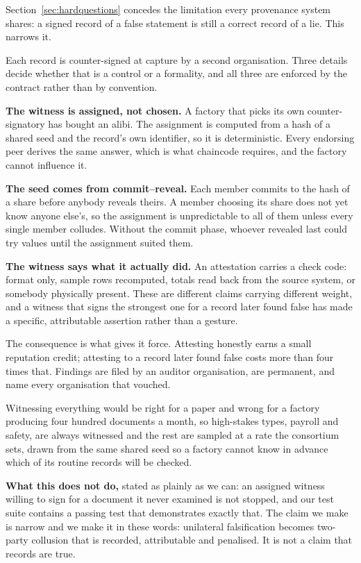 \documentclass[11pt,a4paper]{article}
\begin{document}
Section~\ref{sec:hardquestions} concedes the limitation every provenance system
shares: a signed record of a false statement is still a correct record of a lie.
This narrows it.

Each record is counter-signed at capture by a second organisation. Three details
decide whether that is a control or a formality, and all three are enforced by
the contract rather than by convention.

\textbf{The witness is assigned, not chosen.} A factory that picks its own
counter-signatory has bought an alibi. The assignment is computed from a hash of
a shared seed and the record's own identifier, so it is deterministic. Every
endorsing peer derives the same answer, which is what chaincode requires, and the
factory cannot influence it.

\textbf{The seed comes from commit--reveal.} Each member commits to the hash of a
share before anybody reveals theirs. A member choosing its share does not yet know
anyone else's, so the assignment is unpredictable to all of them unless every
single member colludes. Without the commit phase, whoever revealed last could try
values until the assignment suited them.

\textbf{The witness says what it actually did.} An attestation carries a check
code: format only, sample rows recomputed, totals read back from the source
system, or somebody physically present. These are different claims carrying
different weight, and a witness that signs the strongest one for a record later
found false has made a specific, attributable assertion rather than a gesture.

The consequence is what gives it force. Attesting honestly earns a small
reputation credit; attesting to a record later found false costs more than four
times that. Findings are filed by an auditor organisation, are permanent, and
name every organisation that vouched.

Witnessing everything would be right for a paper and wrong for a factory
producing four hundred documents a month, so high-stakes types, payroll and
safety, are always witnessed and the rest are sampled at a rate the consortium
sets, drawn from the same shared seed so a factory cannot know in advance which
of its routine records will be checked.

\textbf{What this does not do,} stated as plainly as we can: an assigned witness
willing to sign for a document it never examined is not stopped, and our test
suite contains a passing test that demonstrates exactly that. The claim we make
is narrow and we make it in these words: unilateral falsification becomes
two-party collusion that is recorded, attributable and penalised. It is not a
claim that records are true.
\end{document}
